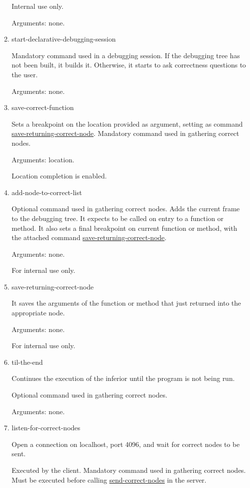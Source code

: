 \begin{enumerate}
Internal use only.

Arguments: none.
\item start-declarative-debugging-session
\label{command:start-declarative-debugging-session}

Mandatory command used in a debugging session.
If the debugging tree has not been built, it builds it. Otherwise, it starts to ask correctness questions to the user.

Arguments: none.
\item save-correct-function
\label{command:save-correct-function}

Sets a breakpoint on the location provided as argument, setting as command \hyperref[command:save-returning-correct-node]{save-returning-correct-node}. Mandatory command used in gathering correct nodes.

Arguments: location.

Location completion is enabled.
\item add-node-to-correct-list
\label{command:add-node-to-correct-list}

Optional command used in gathering correct nodes.
Adds the current frame to the debugging tree.
It expects to be called on entry to a function or method.
It also sets a final breakpoint on current function or method, with the attached command \hyperref[command:save-returning-correct-node]{save-returning-correct-node}.

Arguments: none.

For internal use only.
\item save-returning-correct-node
\label{command:save-returning-correct-node}

It saves the arguments of the function or method that just returned into the appropriate node.

Arguments: none.

For internal use only.
\item til-the-end
\label{command:til-the-end}

Continues the execution of the inferior until the program is not being run.

Optional command used in gathering correct nodes.

Arguments: none.
\item listen-for-correct-nodes
\label{command:listen-for-correct-nodes}

Open a connection on localhost, port 4096, and wait for correct nodes to be sent.

Executed by the client.
Mandatory command used in gathering correct nodes.
Must be executed before calling \hyperref[command:send-correct-nodes]{send-correct-nodes} in the server.


\end{enumerate}
